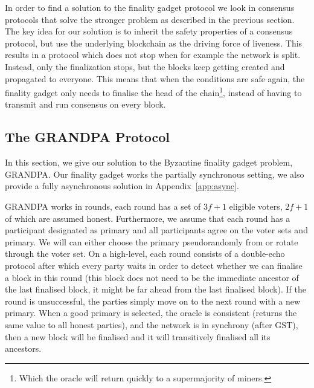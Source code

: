 \documentclass{article}
\def\GST{\mathrm{GST}}
\begin{document}
In order to find a solution to the finality gadget protocol we look in
consensus protocols that solve the stronger problem as described in the previous section. The key idea for our solution is to inherit the safety properties of a consensus protocol, but use the underlying blockchain as the driving force of liveness. This results in a protocol which does not stop when for example the network is split. 
Instead, only the finalization stops, but the blocks keep getting created and propagated to everyone.
This means that when the conditions are safe again, the finality gadget only needs to finalise the head of the chain\footnote{Which the oracle will return quickly to a supermajority of miners.},
instead of having to transmit and run consensus on every block. 





\subsection{The GRANDPA Protocol}\label{sec:grandpa}
In this section, we give our solution to the Byzantine finality gadget problem, GRANDPA.  Our finality gadget works the partially synchronous setting, we also provide a fully asynchronous solution in Appendix~\ref{app:async}.

GRANDPA works in rounds, each round has a set of $3f+1$ eligible voters, $2f+1$ of which are assumed honest. Furthermore, we assume that each round has a participant designated as primary and all participants agree on the voter sets and primary. We will can either choose the primary pseudorandomly from or rotate through the voter set.
On a high-level, each round consists of a double-echo protocol after which every party waits in order to detect whether we can finalise a block in this round (this block does not need to be the immediate ancestor of the last finalised block, it might be far ahead from the last finalised block). If the round is unsuccessful, the parties simply move on to the next round with a new primary. When a good primary is selected, the oracle is consistent (returns the same value to all honest parties),
and the network is in synchrony (after $\GST$), then a new block will be finalised and it will transitively finalised all its ancestors.
\end{document}
